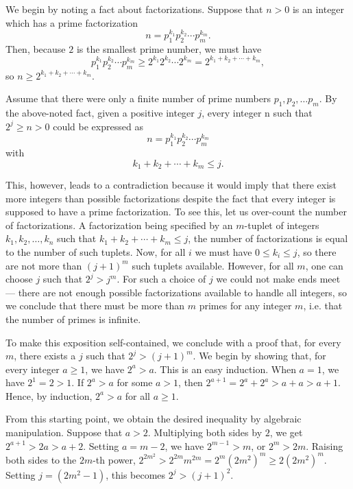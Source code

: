 \documentclass[12pt]{article}
\begin{document}
We begin by noting a fact about factorizations.  Suppose that $n > 0$ is an integer
which has a prime factorization
\[
 n = p_1^{k_1} p_2^{k_2} \cdots p_m^{k_m} .
\]
Then, because $2$ is the smallest prime number, we must have
\[
 p_1^{k_1} p_2^{k_2} \cdots p_m^{k_m} \ge
 2^{k_1} 2^{k_2} \cdots 2^{k_m} =
 2^{k_1 + k_2 + \cdots + k_m},
\]
so $n \ge 2^{k_1 + k_2 + \cdots + k_m}$.

Assume that there were only a finite number of prime numbers $p_1, p_2, \ldots p_m$.
By the above-noted fact, given a positive integer $j$, every integer n such that $2^j \ge n > 0$ could be
expressed as
\[
 n = p_1^{k_1} p_2^{k_2} \cdots p_m^{k_m}
\]
with
\[
 k_1 + k_2 + \cdots + k_m \le j .
\]

This, however, leads to a contradiction because it would imply that there exist more
integers than possible factorizations despite the fact that every integer is supposed
to have a prime factorization.  To see this, let us over-count the number of 
factorizations.  A factorization being specified by an $m$-tuplet of integers
$k_1, k_2, \ldots, k_n$ such that $k_1 + k_2 + \cdots + k_m \le j$, the number of
factorizations is equal to the number of such tuplets.  Now, for all $i$ we must have
$0 \le k_i \le j$, so there are not more than $(j+1)^m$ such tuplets available.
However, for all $m$, one can choose $j$ such that $2^j > j^m$.  For such a choice
of $j$ we could not make ends meet --- there are not enough possible factorizations 
available to handle all integers, so we conclude that there must be more than $m$ primes
for any integer $m$, i.e. that the number of primes is infinite.

To make this exposition self-contained, we conclude with a proof that, for every $m$,
there exists a $j$ such that $2^j > (j+1)^m$.  We begin by showing that, 
for every integer $a \ge 1$, we have $2^a > a$.  This is an easy induction.  When $a = 1$, 
we have $2^1 = 2 > 1$.  If $2^a > a$ for some $a > 1$, then $2^{a+1} = 2^a + 2^a > a + a > a+1$.  
Hence, by induction, $2^a > a$ for all $a \ge 1$.

From this starting point, we obtain the desired inequality by algebraic manipulation.
Suppose that $a > 2$.  Multiplying both sides by $2$, we get $2^{a+1} > 2a > a+2$.
Setting $a = m - 2$, we have $2^{m-1} > m$, or $2^m > 2 m$.  Raising both sides to the
$2m$-th power, $2^{2 m^2} > 2^{2m} m^{2m} = 2^m (2 m^2)^m \ge 2 (2 m^2)^m$.  Setting
$j = (2 m^2 - 1)$, this becomes $2^j > (j+1)^2$.

\end{document}
